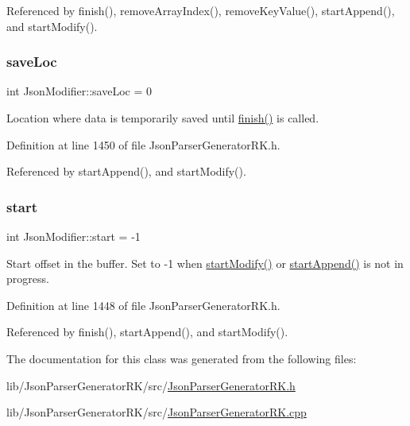 Referenced by finish(), remove\+Array\+Index(), remove\+Key\+Value(), start\+Append(), and start\+Modify().

\mbox{\label{class_json_modifier_a7ea53418d660ce7cdec0964cca76015b}} 
\subsubsection{\texorpdfstring{save\+Loc}{saveLoc}}
{\footnotesize\ttfamily int Json\+Modifier\+::save\+Loc = 0\hspace{0.3cm}{\ttfamily [protected]}}



Location where data is temporarily saved until \hyperlink{class_json_modifier_ae531232fa98f72eea8ea6ba07c065497}{finish()} is called. 



Definition at line 1450 of file Json\+Parser\+Generator\+R\+K.\+h.



Referenced by start\+Append(), and start\+Modify().

\mbox{\label{class_json_modifier_abd83b67763dc4ce55562bbdd5cea1e20}} 
\subsubsection{\texorpdfstring{start}{start}}
{\footnotesize\ttfamily int Json\+Modifier\+::start = -\/1\hspace{0.3cm}{\ttfamily [protected]}}



Start offset in the buffer. Set to -\/1 when \hyperlink{class_json_modifier_aa53d66feb3cd13165f3a2eac012a123b}{start\+Modify()} or \hyperlink{class_json_modifier_ab5bf356377a71120588413a4be998607}{start\+Append()} is not in progress. 



Definition at line 1448 of file Json\+Parser\+Generator\+R\+K.\+h.



Referenced by finish(), start\+Append(), and start\+Modify().



The documentation for this class was generated from the following files\+:\begin{DoxyCompactItemize}
\item 
lib/\+Json\+Parser\+Generator\+R\+K/src/\hyperlink{_json_parser_generator_r_k_8h}{Json\+Parser\+Generator\+R\+K.\+h}\item 
lib/\+Json\+Parser\+Generator\+R\+K/src/\hyperlink{_json_parser_generator_r_k_8cpp}{Json\+Parser\+Generator\+R\+K.\+cpp}\end{DoxyCompactItemize}
